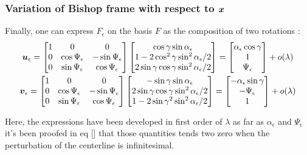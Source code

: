 \subsubsection{Variation of Bishop frame with respect to $\boldsymbol{x}$}
Finally, one can express $F_\epsilon$ on the basis $F$ as the composition of two rotations :
\begin{subequations}
	\begin{gather}
	\boldsymbol{u}_\epsilon =
	\begin{bmatrix}
		1 & 0 & 0 \\
		0 & \cos{\Psi_\epsilon} & -\sin{\Psi_\epsilon} \\
		0 & \sin{\Psi_\epsilon} & \cos{\Psi_\epsilon}
	\end{bmatrix}
	\begin{bmatrix}
		\cos{\gamma}\sin{\alpha_\epsilon} \\
		1-2\cos^2{\gamma}\sin^2{\alpha_\epsilon/2} \\
		2\sin{\gamma}\cos{\gamma}\sin^2{\alpha_\epsilon/2}
	\end{bmatrix}
	=
	\begin{bmatrix}
		\alpha_\epsilon\cos{\gamma}\\
		1 \\
		\Psi_\epsilon
	\end{bmatrix}
	+ o(\lambda)
	\\
	\boldsymbol{v}_\epsilon =
	\begin{bmatrix}
		1 & 0 & 0 \\
		0 & \cos{\Psi_\epsilon} & -\sin{\Psi_\epsilon} \\
		0 & \sin{\Psi_\epsilon} & \cos{\Psi_\epsilon}
	\end{bmatrix}
	\begin{bmatrix}
		-\sin{\gamma}\sin{\alpha_\epsilon} \\
		2\sin{\gamma}\cos{\gamma}\sin^2{\alpha_\epsilon/2} \\
		1-2\sin{\gamma}^2\sin^2{\alpha_\epsilon/2}
	\end{bmatrix}
	=
	\begin{bmatrix}
		-\alpha_\epsilon\sin{\gamma}\\
		-\Psi_\epsilon \\
		1
	\end{bmatrix}
	+ o(\lambda)
	\end{gather}
\end{subequations}

%
Here, the expressions have been developed in first order of $\lambda$ as far as $\alpha_\epsilon$ and $\Psi_\epsilon$ it's been proofed in eq [] that those quantities tends two zero when the perturbation of the centerline is infinitesimal.

